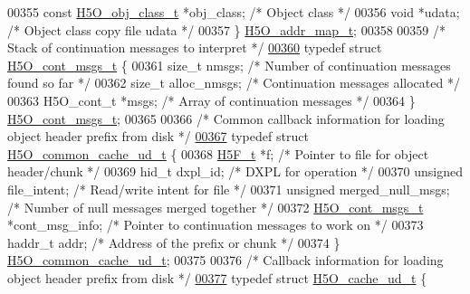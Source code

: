 \begin{DoxyCode}
00355     \textcolor{keyword}{const} \hyperlink{struct_h5_o__obj__class__t}{H5O\_obj\_class\_t} *obj\_class;   \textcolor{comment}{/* Object class */}
00356     \textcolor{keywordtype}{void}        *udata;                 \textcolor{comment}{/* Object class copy file udata */}
00357 \} \hyperlink{struct_h5_o__addr__map__t}{H5O\_addr\_map\_t};
00358 
00359 \textcolor{comment}{/* Stack of continuation messages to interpret */}
\hyperlink{struct_h5_o__cont__msgs__t}{00360} \textcolor{keyword}{typedef} \textcolor{keyword}{struct }\hyperlink{struct_h5_o__cont__msgs__t}{H5O\_cont\_msgs\_t} \{
00361     \textcolor{keywordtype}{size\_t}      nmsgs;                  \textcolor{comment}{/* Number of continuation messages found so far */}
00362     \textcolor{keywordtype}{size\_t}  alloc\_nmsgs;        \textcolor{comment}{/* Continuation messages allocated */}
00363     H5O\_cont\_t *msgs;           \textcolor{comment}{/* Array of continuation messages */}
00364 \} \hyperlink{struct_h5_o__cont__msgs__t}{H5O\_cont\_msgs\_t};
00365 
00366 \textcolor{comment}{/* Common callback information for loading object header prefix from disk */}
\hyperlink{struct_h5_o__common__cache__ud__t}{00367} \textcolor{keyword}{typedef} \textcolor{keyword}{struct }\hyperlink{struct_h5_o__common__cache__ud__t}{H5O\_common\_cache\_ud\_t} \{
00368     \hyperlink{struct_h5_f__t}{H5F\_t} *f;                           \textcolor{comment}{/* Pointer to file for object header/chunk */}
00369     hid\_t dxpl\_id;                      \textcolor{comment}{/* DXPL for operation */}
00370     \textcolor{keywordtype}{unsigned} file\_intent;               \textcolor{comment}{/* Read/write intent for file */}
00371     \textcolor{keywordtype}{unsigned} merged\_null\_msgs;          \textcolor{comment}{/* Number of null messages merged together */}
00372     \hyperlink{struct_h5_o__cont__msgs__t}{H5O\_cont\_msgs\_t} *cont\_msg\_info;     \textcolor{comment}{/* Pointer to continuation messages to work on */}
00373     haddr\_t addr;                       \textcolor{comment}{/* Address of the prefix or chunk */}
00374 \} \hyperlink{struct_h5_o__common__cache__ud__t}{H5O\_common\_cache\_ud\_t};
00375 
00376 \textcolor{comment}{/* Callback information for loading object header prefix from disk */}
\hyperlink{struct_h5_o__cache__ud__t}{00377} \textcolor{keyword}{typedef} \textcolor{keyword}{struct }\hyperlink{struct_h5_o__cache__ud__t}{H5O\_cache\_ud\_t} \{

\end{DoxyCode}
